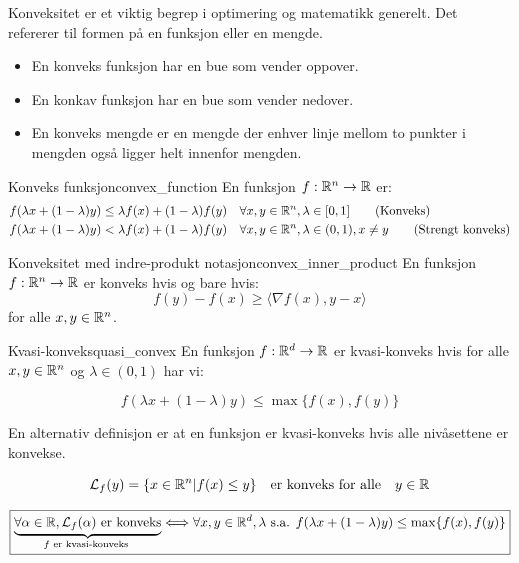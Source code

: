 Konveksitet er et viktig begrep i optimering og matematikk generelt. Det refererer til formen på en funksjon eller en mengde.
\begin{itemize}
	\item En konveks funksjon har en bue som vender oppover.
	\item En konkav funksjon har en bue som vender nedover.
	\item En konveks mengde er en mengde der enhver linje mellom to punkter i mengden også ligger helt innenfor mengden.
\end{itemize}

\begin{definition}{Konveks funksjon}{convex_function}
	En funksjon \(f: \mathbb{R}^n \to \mathbb{R}\) er:
	\begin{align*}
		f(\lambda x + (1-\lambda)y) & \leq \lambda f(x) + (1-\lambda)f(y) \quad \forall x, y \in \mathbb{R}^n, \lambda \in [0, 1] \tag{Konveks}                  \\
		f(\lambda x + (1-\lambda)y) & < \lambda f(x) + (1 - \lambda)f(y) \quad \forall x, y \in \mathbb{R}^n, \lambda \in (0, 1), x \neq y \tag{Strengt konveks}
	\end{align*}
\end{definition}

\begin{remark}{Konveksitet med indre-produkt notasjon}{convex_inner_product}
	En funksjon  \(f: \mathbb{R}^n \to \mathbb{R}\) er konveks hvis og bare hvis:
	\[
		f(y) - f(x) \geq  \langle \nabla f(x), y - x \rangle
	\]
	for alle  \(x, y \in \mathbb{R}^n\).
\end{remark}


\begin{remark}{Kvasi-konveks}{quasi_convex}
	En funksjon \(f: \mathbb{R}^d \to \mathbb{R}\) er kvasi-konveks hvis for alle \(x, y \in \mathbb{R}^n\) og \(\lambda \in (0, 1)\) har vi:

	\[
		f(\lambda x + (1 - \lambda)y) \leq \max\{f(x), f(y)\}
	\]

	En alternativ definisjon er at en funksjon er kvasi-konveks hvis alle nivåsettene er konvekse.

	\[
		\mathcal{L}_f(y) = \{x \in \mathbb{R}^n | f(x) \leq y\} \quad \text{er konveks for alle} \quad y \in \mathbb{R}
	\]

	\[
		\boxed{\underbrace{\forall \alpha \in \mathbb{R}, \mathcal{L}_f(\alpha) \text{ er konveks}}_{f \text{ er kvasi-konveks }}\Longleftrightarrow \forall x, y \in \mathbb{R}^d,\lambda \text{ s.a. } f(\lambda x + (1-\lambda)y) \leq \max \{ f(x), f(y) \}}
	\]
\end{remark}

